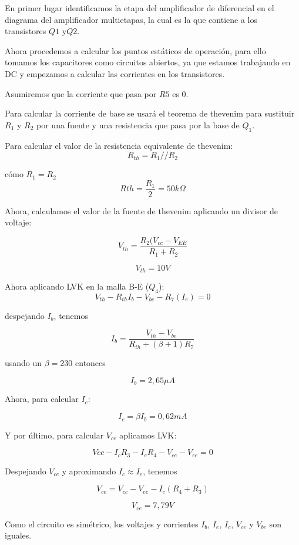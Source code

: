 \documentclass{article}
\begin{document}



En primer lugar identificamos la etapa del amplificador de diferencial en el diagrama del amplificador multietapas, la cual es la que contiene a los transistores $Q1$ y$Q2$.

Ahora procedemos a calcular los puntos estáticos de operación, para ello tomamos los capacitores como circuitos abiertos, ya que estamos trabajando en DC y empezamos a calcular las corrientes en los transistores.

Asumiremos que la corriente que pasa por $R5$ es 0.

Para calcular la corriente de base se usará el teorema de thevenim para sustituir $R_1$ y $R_2$ por una fuente y una resistencia que pasa por la base de $Q_1$.

Para calcular el valor de la resistencia equivalente de thevenim:
$$R_{th} = R_1 // R_2$$

cómo $R_1 = R_2$
$$Rth = \frac{R_1}{2} = 50k \Omega$$

Ahora, calculamos el valor de la fuente de thevenim aplicando un divisor de voltaje:

$$V_{th} = \frac{R_2 ( V_{cc} - V_{EE}}{R_1 + R_2}$$

$$V_{th} = 10 V$$

Ahora aplicando LVK en la malla B-E ($Q_4$):
\begin{equation*}
V_{th} - R_{th}I_b - V_{be} - R_7(I_e) = 0
\end{equation*}

despejando $I_b$, tenemos

\begin{equation*}
    I_b = \frac{V_{th} - V_{be}}{R_{th} + (\beta + 1) R_7}
\end{equation*}

usando un $\beta = 230$ entonces

$$I_{b} = 2,65\mu A$$

Ahora, para calcular $I_c$:

$$I_{c} = \beta I_b = 0,62mA$$

Y por último, para calcular $V_{ce}$ aplicamos LVK:

$$Vcc - I_cR_3 - I_eR_4 - V_{ce} - V_{ee} = 0$$

Despejando $V_{ce}$ y aproximando $I_c \approx I_e$, tenemos 

$$V_{ce} = V_{cc}  - V_{ee} - I_c (R_4 + R_3)$$

$$V_{ce} = 7,79 V$$

Como el circuito es simétrico, los voltajes y corrientes $I_b$, $I_e$, $I_c$, $V_{ce}$ y $V_{be}$ son iguales.
\end{document}
